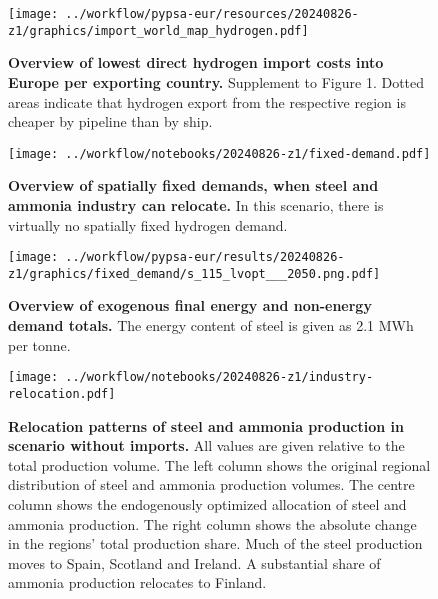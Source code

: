 \begin{figure}[!htb]
    \texttt{[image: ../workflow/pypsa-eur/resources/20240826-z1/graphics/import\_world\_map\_hydrogen.pdf]} \\
    \caption{\textbf{Overview of lowest direct hydrogen import costs into Europe
    per exporting country.} Supplement to Figure 1. Dotted areas indicate that
    hydrogen export from the respective region is cheaper by pipeline than by
    ship.}
    \label{fig:si:worlmap-h2}
\end{figure}


\begin{figure}[!htb]
    \texttt{[image: ../workflow/notebooks/20240826-z1/fixed-demand.pdf]} \\
    \caption{\textbf{Overview of spatially fixed demands, when steel and ammonia
    industry can relocate.} In this scenario, there is virtually no spatially
    fixed hydrogen demand.}
    \label{fig:si:demands}
\end{figure}

\begin{figure}[!htb]
    \texttt{[image: ../workflow/pypsa-eur/results/20240826-z1/graphics/fixed\_demand/s\_115\_lvopt\_\_\_2050.png.pdf]} \\
    \caption{\textbf{Overview of exogenous final energy and non-energy demand totals.}
    The energy content of steel is given as 2.1 MWh per tonne.
    }
    \label{fig:si:demand_totals}
\end{figure}


\begin{figure}[!htb]
    \texttt{[image: ../workflow/notebooks/20240826-z1/industry-relocation.pdf]} \\
    \caption{\textbf{Relocation patterns of steel and ammonia production in
    scenario without imports.} All values are given relative to the total
    production volume. The left column shows the original regional distribution
    of steel and ammonia production volumes. The centre column shows the
    endogenously optimized allocation of steel and ammonia production. The right
    column shows the absolute change in the regions' total production share.
    Much of the steel production moves to Spain, Scotland and Ireland. A
    substantial share of ammonia production relocates to Finland.}
    \label{fig:si:relocation}
\end{figure}

